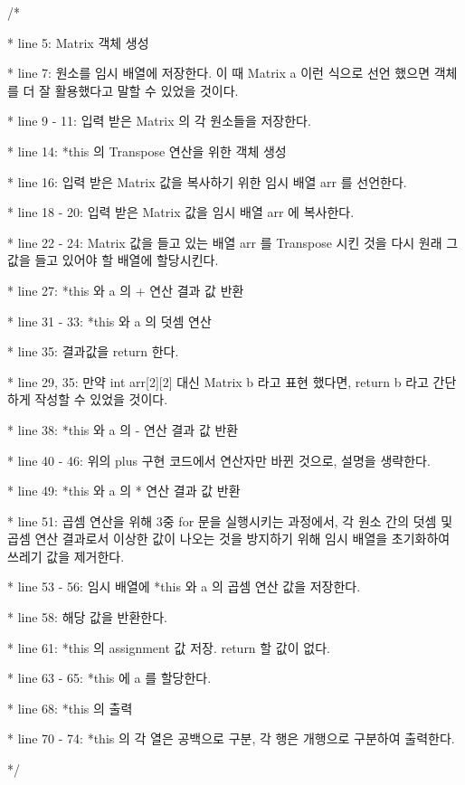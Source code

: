 \documentclass[twoside,twocolumn]{article}
\newenvironment{itemizeReduced}{
\begin{list}{\labelitemi}{\leftmargin=1em}
\setlength{\itemsep}{1pt}
\setlength{\parskip}{0pt}
\setlength{\parsep}{0pt}}{\end{list}
}
\begin{document}
\begin{itemizeReduced}
    \item[/*] 
    \item[*] line 5: Matrix 객체 생성
    \item[*] line 7: 원소를 임시 배열에 저장한다. 이 때 Matrix a 이런 식으로 선언 했으면 객체를 더 잘 활용했다고 말할 수 있었을 것이다.
    \item[*] line 9 - 11: 입력 받은 Matrix 의 각 원소들을 저장한다.
    \item[*] line 14: *this 의 Transpose 연산을 위한 객체 생성
    \item[*] line 16: 입력 받은 Matrix 값을 복사하기 위한 임시 배열 arr 를 선언한다.
    \item[*] line 18 - 20: 입력 받은 Matrix 값을 임시 배열 arr 에 복사한다.
    \item[*] line 22 - 24: Matrix 값을 들고 있는 배열 arr 를 Transpose 시킨 것을 다시 원래 그 값을 들고 있어야 할 배열에 할당시킨다.
    \item[*] line 27: *this 와 a 의 + 연산 결과 값 반환
    \item[*] line 31 - 33: *this 와 a 의 덧셈 연산
    \item[*] line 35: 결과값을 return 한다.
    \item[*] line 29, 35: 만약 int arr[2][2] 대신 Matrix b 라고 표현 했다면, return b 라고 간단하게 작성할 수 있었을 것이다.
    \item[*] line 38: *this 와 a 의 - 연산 결과 값 반환
    \item[*] line 40 - 46: 위의 plus 구현 코드에서 연산자만 바뀐 것으로, 설명을 생략한다.
    \item[*] line 49: *this 와 a 의 * 연산 결과 값 반환
    \item[*] line 51: 곱셈 연산을 위해 3중 for 문을 실행시키는 과정에서, 각 원소 간의 덧셈 및 곱셈 연산 결과로서 이상한 값이 나오는 것을 방지하기 위해 임시 배열을 초기화하여 쓰레기 값을 제거한다. 
    \item[*] line 53 - 56: 임시 배열에 *this 와 a 의 곱셈 연산 값을 저장한다.
    \item[*] line 58: 해당 값을 반환한다.
    \item[*] line 61: *this 의 assignment 값 저장. return 할 값이 없다.
    \item[*] line 63 - 65: *this 에 a 를 할당한다.
    \item[*] line 68: *this 의 출력
    \item[*] line 70 - 74: *this 의 각 열은 공백으로 구분, 각 행은 개행으로 구분하여 출력한다.
\end{itemizeReduced}
*/
\end{document}

